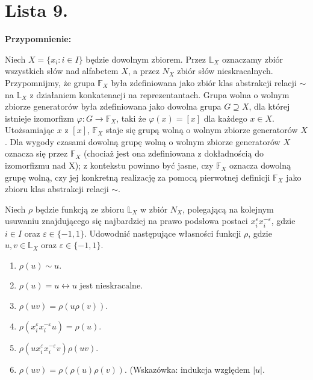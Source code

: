 \chapter{Lista 9.}

\noindent\textbf{Przypomnienie:}

Niech $X = \{x_{i}: i \in I\} $ będzie dowolnym zbiorem. Przez $\mathbb{L}_{X}$ oznaczamy zbiór wszystkich słów nad alfabetem $X$, a przez  $N_{X}$ zbiór słów nieskracalnych. Przypomnijmy, że grupa $\mathbb{F}_{X}$ była zdefiniowana jako zbiór klas abstrakcji relacji $\sim  $ na $\mathbb{L}_{X}$ z działaniem konkatenacji na reprezentantach. Grupa wolna o wolnym zbiorze generatorów była zdefiniowana jako dowolna grupa $G \supseteq X$, dla której istnieje izomorfizm $\varphi : G \to \mathbb{F}_{X} $, taki że $\varphi \left( x \right) = \left[ x \right]  $ dla każdego $x \in X$. Utożsamiając  $x$ z $\left[ x \right] $, $\mathbb{F}_{X}$ staje się grupą wolną o wolnym zbiorze generatorów $X$. Dla wygody czasami dowolną grupę wolną o wolnym zbiorze generatorów $X$ oznacza się przez $\mathbb{F}_{X}$ (chociaż jest ona zdefiniowana z dokładnością do izomorfizmu nad X); z kontekstu powinno być jasne, czy $\mathbb{F}_{X}$ oznacza dowolną grupę wolną, czy jej konkretną realizację za pomocą pierwotnej definicji $\mathbb{F}_{X}$ jako zbioru klas abstrakcji relacji $\sim$.
\begin{problem}[1]
	Niech $\rho$ będzie funkcją ze zbioru $\mathbb{L}_{X}$ w zbiór $N_{X}$, polegającą na kolejnym usuwaniu znajdującego się najbardziej na prawo podsłowa postaci $x_{i}^{\varepsilon}x_{i}^{-\varepsilon}$, gdzie $i \in I$ oraz $\varepsilon \in \{-1,1\} $. Udowodnić następujące własności funkcji $\rho$, gdzie $u,v \in \mathbb{L}_{X}$ oraz $\varepsilon \in \{-1,1\}$.
	\begin{enumerate}[label=(\alph*)]
		\item $\rho\left( u \right) \sim u $.
		\item $\rho\left( u \right) = u \leftrightarrow u \text{ jest nieskracalne}$.
		\item $\rho\left( uv \right) = \rho\left( u\rho\left( v \right)  \right) $.
		\item $\rho\left( x_{i}^{\varepsilon}x_{i}^{-\varepsilon }u \right) = \rho\left( u \right) $.
		\item $\rho\left( ux_{i}^{\varepsilon }x_{i}^{-\varepsilon } v\right) \rho\left( uv \right) $.
		\item $\rho\left( uv \right) = \rho\left( \rho\left( u \right) \rho\left( v \right)\right)$. (Wskazówka: indukcja względem $\left| u \right|.$
	\end{enumerate}
\end{problem} 
\begin{solution}

\end{solution} 
\begin{problem}[2]
	
\end{problem} 
